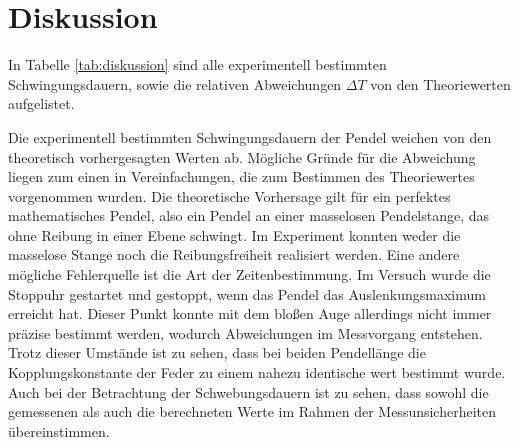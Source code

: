 \section{Diskussion}
In Tabelle \ref{tab:diskussion} sind alle experimentell bestimmten Schwingungsdauern, sowie die relativen Abweichungen $\Delta T$ von den Theoriewerten aufgelistet.

Die experimentell bestimmten Schwingungsdauern der Pendel weichen von den theoretisch vorhergesagten Werten ab.
Mögliche Gründe für die Abweichung liegen zum einen in Vereinfachungen, die zum Bestimmen des Theoriewertes vorgenommen wurden. Die theoretische Vorhersage gilt für ein perfektes 
mathematisches Pendel, also ein Pendel an einer masselosen Pendelstange, das ohne Reibung in einer Ebene schwingt. Im Experiment konnten weder die masselose Stange noch die 
Reibungsfreiheit realisiert werden. Eine andere mögliche Fehlerquelle ist die Art der Zeitenbestimmung. Im Versuch wurde die Stoppuhr gestartet und gestoppt, wenn das Pendel 
das Auslenkungsmaximum erreicht hat. Dieser Punkt konnte mit dem bloßen Auge allerdings nicht immer präzise bestimmt werden, wodurch Abweichungen im Messvorgang entstehen. Trotz 
dieser Umstände ist zu sehen, dass bei beiden Pendellänge die Kopplungskonstante der Feder zu einem nahezu identische wert bestimmt wurde. Auch bei der Betrachtung der 
Schwebungsdauern ist zu sehen, dass sowohl die gemessenen als auch die berechneten Werte im Rahmen der Messunsicherheiten übereinstimmen.